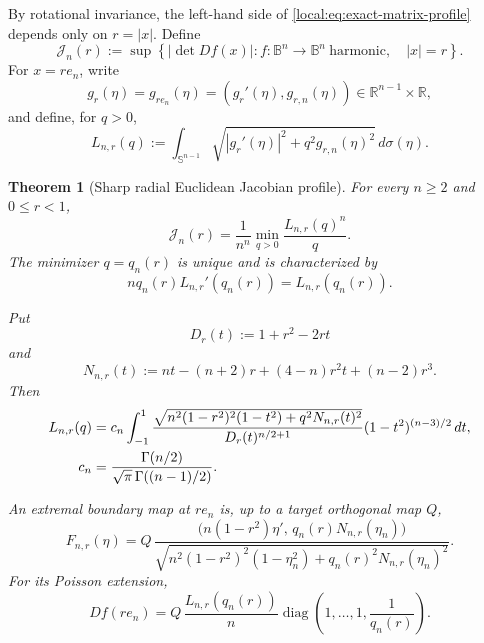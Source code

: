 \documentclass[11pt,reqno]{amsart}
\newtheorem{theorem}{Theorem}[section]
\theoremstyle{remark}
\newcommand{\R}{\mathbb R}
\newcommand{\B}{\mathbb B}
\newcommand{\Sph}{\mathbb S}
\begin{document}
By rotational invariance, the left-hand side of
\eqref{local:eq:exact-matrix-profile} depends only on $r=|x|$.  Define
\begin{equation}\label{local:eq:Jn-definition}
 \mathcal J_n(r)
 :=
 \sup\left\{
 |\det Df(x)|:
 f:\B^n\to\B^n\ \text{harmonic},\quad |x|=r
 \right\}.
\end{equation}
For $x=re_n$, write
\[
 g_r(\eta)=g_{re_n}(\eta)=(g_r'(\eta),g_{r,n}(\eta))
 \in\R^{n-1}\times\R,
\]
and define, for $q>0$,
\begin{equation}\label{local:eq:Lnrq-definition}
 L_{n,r}(q)
 :=
 \int_{\Sph^{n-1}}
 \sqrt{|g_r'(\eta)|^2+q^2g_{r,n}(\eta)^2}\,d\sigma(\eta).
\end{equation}

\begin{theorem}[Sharp radial Euclidean Jacobian profile]
\label{local:thm:sharp-radial-euclidean-profile}
For every $n\ge2$ and $0\le r<1$,
\begin{equation}\label{local:eq:Jn-exact-one-parameter}
 \mathcal J_n(r)
 =
 \frac1{n^n}
 \min_{q>0}
 \frac{L_{n,r}(q)^n}{q}.
\end{equation}
The minimizer $q=q_n(r)$ is unique and is characterized by
\begin{equation}\label{local:eq:q-stationarity}
 n q_n(r)L_{n,r}'(q_n(r))
 =
 L_{n,r}(q_n(r)).
\end{equation}

Put
\begin{equation}\label{local:eq:D-N-definition}
 D_r(t):=1+r^2-2rt
\end{equation}
and
\begin{equation}\label{local:eq:Nnr-definition}
 N_{n,r}(t)
 :=
 nt-(n+2)r+(4-n)r^2t+(n-2)r^3.
\end{equation}
Then
\begin{align}
 L_{n,r}(q)
 &=c_n\int_{-1}^1
 \frac{
 \sqrt{
 n^2(1-r^2)^2(1-t^2)+q^2N_{n,r}(t)^2
 }
 }{
 D_r(t)^{n/2+1}
 }
 (1-t^2)^{(n-3)/2}\,dt,
 \label{local:eq:Lnrq-one-dimensional}\\
 c_n
 &=
 \frac{\Gamma(n/2)}{\sqrt\pi\,\Gamma((n-1)/2)}.
 \notag
\end{align}

An extremal boundary map at $re_n$ is, up to a target orthogonal map $Q$,
\begin{equation}\label{local:eq:radial-extremal-boundary}
 F_{n,r}(\eta)
 =
 Q\,
 \frac{
 \bigl(
 n(1-r^2)\eta',\,
 q_n(r)N_{n,r}(\eta_n)
 \bigr)
 }{
 \sqrt{
 n^2(1-r^2)^2(1-\eta_n^2)
 +q_n(r)^2N_{n,r}(\eta_n)^2
 }
 }.
\end{equation}
For its Poisson extension,
\begin{equation}\label{local:eq:radial-extremal-derivative}
 Df(re_n)
 =
 Q\,
 \frac{L_{n,r}(q_n(r))}{n}
 \operatorname{diag}\left(1,\ldots,1,\frac1{q_n(r)}\right).
\end{equation}
\end{theorem}
\end{document}
